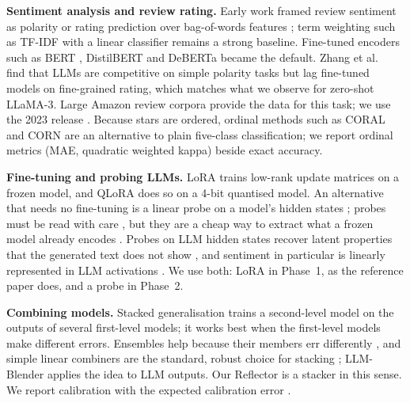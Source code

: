 \documentclass[runningheads]{llncs}
\begin{document}
\textbf{Sentiment analysis and review rating.} Early work framed review sentiment as polarity or rating prediction over bag-of-words features \cite{pang2008}; term weighting such as TF-IDF \cite{salton1988} with a linear classifier remains a strong baseline. Fine-tuned encoders such as BERT \cite{devlin2019bert}, DistilBERT \cite{sanh2019distilbert} and DeBERTa \cite{he2021deberta,he2021debertav3} became the default. Zhang et al.\ \cite{zhang2023sentiment} find that LLMs are competitive on simple polarity tasks but lag fine-tuned models on fine-grained rating, which matches what we observe for zero-shot LLaMA-3. Large Amazon review corpora \cite{ni2019,hou2024} provide the data for this task; we use the 2023 release \cite{hou2024}. Because stars are ordered, ordinal methods such as CORAL \cite{cao2020coral} and CORN \cite{shi2023corn} are an alternative to plain five-class classification; we report ordinal metrics (MAE, quadratic weighted kappa) beside exact accuracy.

\textbf{Fine-tuning and probing LLMs.} LoRA \cite{hu2022lora} trains low-rank update matrices on a frozen model, and QLoRA \cite{dettmers2023qlora} does so on a 4-bit quantised model. An alternative that needs no fine-tuning is a linear probe on a model's hidden states \cite{alain2016probes}; probes must be read with care \cite{hewitt2019control}, but they are a cheap way to extract what a frozen model already encodes \cite{belinkov2022probing}. Probes on LLM hidden states recover latent properties that the generated text does not show \cite{burns2023latent}, and sentiment in particular is linearly represented in LLM activations \cite{tigges2023sentiment}. We use both: LoRA in Phase~1, as the reference paper does, and a probe in Phase~2.

\textbf{Combining models.} Stacked generalisation \cite{wolpert1992} trains a second-level model on the outputs of several first-level models; it works best when the first-level models make different errors. Ensembles help because their members err differently \cite{dietterich2000ensemble}, and simple linear combiners are the standard, robust choice for stacking \cite{breiman1996stacked}; LLM-Blender \cite{jiang2023llmblender} applies the idea to LLM outputs. Our Reflector is a stacker in this sense. We report calibration with the expected calibration error \cite{guo2017calibration}.
\end{document}
